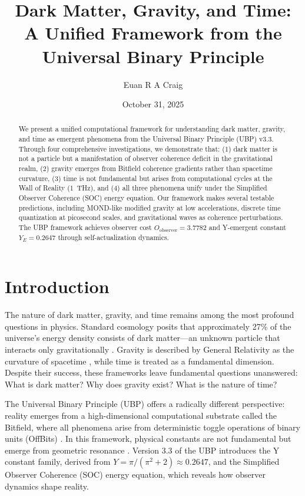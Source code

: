 \documentclass[12pt,a4paper]{article}
\title{\textbf{Dark Matter, Gravity, and Time:\\
A Unified Framework from the Universal Binary Principle}}
\author[1]{Euan R A Craig}
\affil[1]{Independent Researcher, New Zealand\\
\texttt{info@digitaleuan.com}}
\date{October 31, 2025}
\begin{document}
\maketitle

\begin{abstract}
We present a unified computational framework for understanding dark matter, gravity, and time as emergent phenomena from the Universal Binary Principle (UBP) v3.3. Through four comprehensive investigations, we demonstrate that: (1) dark matter is not a particle but a manifestation of observer coherence deficit in the gravitational realm, (2) gravity emerges from Bitfield coherence gradients rather than spacetime curvature, (3) time is not fundamental but arises from computational cycles at the Wall of Reality (\SI{1}{THz}), and (4) all three phenomena unify under the Simplified Observer Coherence (SOC) energy equation. Our framework makes several testable predictions, including MOND-like modified gravity at low accelerations, discrete time quantization at picosecond scales, and gravitational waves as coherence perturbations. The UBP framework achieves observer cost $O_{\text{observer}} = 3.7782$ and Y-emergent constant $Y_E = 0.2647$ through self-actualization dynamics.
\end{abstract}

\section{Introduction}

The nature of dark matter, gravity, and time remains among the most profound questions in physics. Standard cosmology posits that approximately 27\% of the universe's energy density consists of dark matter---an unknown particle that interacts only gravitationally \cite{planck2018}. Gravity is described by General Relativity as the curvature of spacetime \cite{einstein1915}, while time is treated as a fundamental dimension. Despite their success, these frameworks leave fundamental questions unanswered: What is dark matter? Why does gravity exist? What is the nature of time?

The Universal Binary Principle (UBP) offers a radically different perspective: reality emerges from a high-dimensional computational substrate called the Bitfield, where all phenomena arise from deterministic toggle operations of binary units (OffBits) \cite{craig2025ubp}. In this framework, physical constants are not fundamental but emerge from geometric resonance \cite{craig2025constants}. Version 3.3 of the UBP introduces the Y constant family, derived from $Y = \pi/(\pi^2 + 2) \approx 0.2647$, and the Simplified Observer Coherence (SOC) energy equation, which reveals how observer dynamics shape reality.
\end{document}

